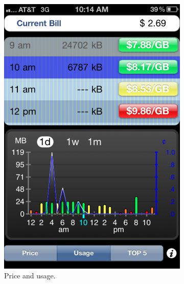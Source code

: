 \begin{figure}[t]
\begin{center}
\begin{subfigure}[b]{0.22\textwidth}
	\includegraphics[width=\textwidth]{Figures/iphone_ui2.pdf}
	\caption{Price and usage.}
\end{subfigure}
%
\begin{subfigure}[b]{0.22\textwidth}

\end{subfigure}
\end{center}
\end{figure}
